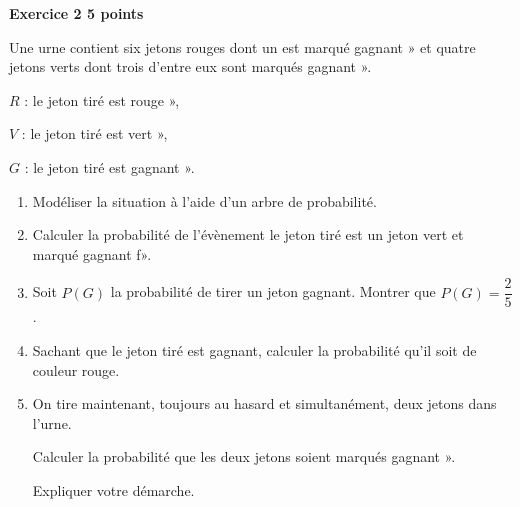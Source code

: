 \textbf{\large Exercice 2 \hfill 5 points}

\bigskip

Une urne contient six jetons rouges dont un est marqué \og gagnant » et quatre jetons verts dont trois d'entre eux sont marqués \og gagnant ».

\begin{list}{}{On tire au hasard un jeton de l'urne et on note les évènements :}
\item $R$ : \og le jeton tiré est rouge »,
\item $V$ : \og le jeton tiré est vert »,
\item $G$ : \og le jeton tiré est gagnant ».
\end{list}

\medskip

\begin{enumerate}
\item  Modéliser la situation à l'aide d'un arbre de probabilité.

\item Calculer la probabilité de l'évènement \og le jeton tiré est un jeton vert et marqué gagnant f».

\item Soit $P(G)$ la probabilité de tirer un jeton gagnant. Montrer que $P(G) = \dfrac{2}{5}$.

\item Sachant que le jeton tiré est gagnant, calculer la probabilité qu'il soit de couleur rouge.

\item On tire maintenant, toujours au hasard et simultanément, deux jetons dans l'urne.

Calculer la probabilité que les deux jetons soient marqués \og gagnant ». 

Expliquer votre démarche.
\end{enumerate}

\vspace{0.5cm}

